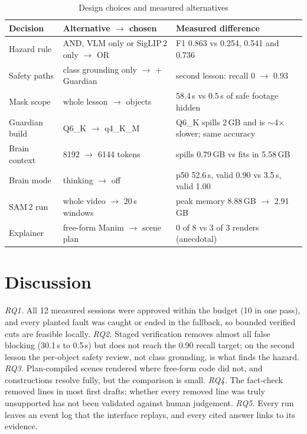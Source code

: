\documentclass[9pt,a4paper]{extarticle}
\begin{document}
\begin{table}[t]
\caption{Design choices and measured alternatives}
\label{tab:alts}
\centering
\begin{tabular}{|L{2.4cm}|L{4.6cm}|L{6.3cm}|}
\hline
Decision & Alternative $\rightarrow$ chosen & Measured difference\\
\hline
Hazard rule & AND, VLM only or SigLIP\,2 only $\rightarrow$ OR & F1 0.863 vs 0.254, 0.541 and 0.736\\
Safety paths & class grounding only $\rightarrow$ + Guardian & second lesson: recall 0 $\rightarrow$ 0.93\\
Mask scope & whole lesson $\rightarrow$ objects & 58.4\,s vs 0.5\,s of safe footage hidden\\
Guardian build & Q6\_K $\rightarrow$ q4\_K\_M & Q6\_K spills 2\,GB and is $\sim$4$\times$ slower; same accuracy\\
Brain context & 8192 $\rightarrow$ 6144 tokens & spills 0.79\,GB vs fits in 5.58\,GB\\
Brain mode & thinking $\rightarrow$ off & p50 52.6\,s, valid 0.90 vs 3.5\,s, valid 1.00\\
SAM\,2 run & whole video $\rightarrow$ 20\,s windows & peak memory 8.88\,GB $\rightarrow$ 2.91\,GB\\
Explainer & free-form Manim $\rightarrow$ scene plan & 0 of 8 vs 3 of 3 renders (anecdotal)\\
\hline
\end{tabular}
\end{table}

\section{Discussion}
\emph{RQ1.} All 12 measured sessions were approved within the budget (10 in one pass), and every planted fault was
caught or ended in the fallback, so bounded verified cuts are feasible locally. \emph{RQ2.} Staged verification removes
almost all false blocking (30.1\,s to 0.5\,s) but does not reach the 0.90 recall target; on the second lesson the
per-object safety review, not class grounding, is what finds the hazard. \emph{RQ3.} Plan-compiled scenes rendered
where free-form code did not, and constructions resolve fully, but the comparison is small. \emph{RQ4.} The fact-check
removed lines in most first drafts; whether every removed line was truly unsupported has not been validated against
human judgement. \emph{RQ5.} Every run leaves an event log that the interface replays, and every cited answer links to
its evidence.
\end{document}
